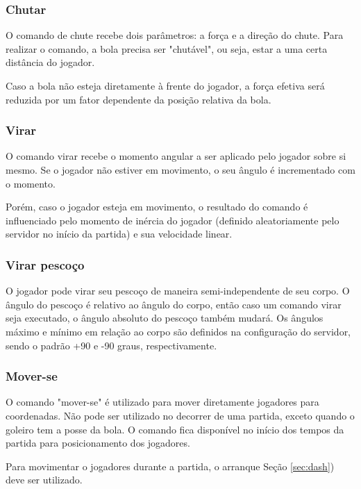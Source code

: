 \subsubsection{Chutar}

O comando de chute recebe dois parâmetros: a força e a direção do chute. Para realizar o comando, a bola precisa ser "chutável", ou seja, estar a uma certa distância do jogador.

Caso a bola não esteja diretamente à frente do jogador, a força efetiva será reduzida por um fator dependente da posição relativa da bola.

\subsubsection{Virar}

O comando virar recebe o momento angular a ser aplicado pelo jogador sobre si mesmo. Se o jogador não estiver em movimento, o seu ângulo é incrementado com o momento.

Porém, caso o jogador esteja em movimento, o resultado do comando é influenciado pelo momento de inércia do jogador (definido aleatoriamente pelo servidor no início da partida) e sua velocidade linear.

\subsubsection{Virar pescoço}

O jogador pode virar seu pescoço de maneira semi-independente de seu corpo. O ângulo do pescoço é relativo ao ângulo do corpo, então caso um comando virar seja executado, o ângulo absoluto do pescoço também mudará. Os ângulos máximo e mínimo em relação ao corpo são definidos na configuração do servidor, sendo o padrão +90 e -90 graus, respectivamente.

\subsubsection{Mover-se}
\label{sec:move}

O comando "mover-se" é utilizado para mover diretamente jogadores para coordenadas. Não pode ser utilizado no decorrer de uma partida, exceto quando o goleiro tem a posse da bola.  O comando fica disponível no início dos tempos da partida para posicionamento dos jogadores.

Para movimentar o jogadores durante a partida, o arranque Seção \ref{sec:dash}) deve ser utilizado.

